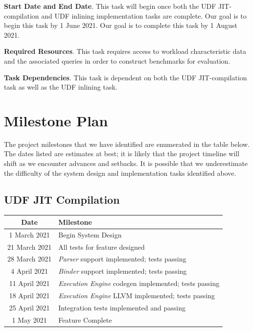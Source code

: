 \documentclass{vldb}
\begin{document}
\textbf{Start Date and End Date}. This task will begin once both the UDF JIT-compilation and UDF inlining implementation tasks are complete. Our goal is to begin this task by 1 June 2021. Our goal is to complete this task by 1 August 2021.

\textbf{Required Resources}. This task requires access to workload characteristic data and the associated queries in order to construct benchmarks for evaluation.

\textbf{Task Dependencies}. This task is dependent on both the UDF JIT-compilation task as well as the UDF inlining task.


\section{Milestone Plan}

The project milestones that we have identified are enumerated in the table below. The dates listed are estimates at best; it is likely that the project timeline will shift as we encounter advances and setbacks. It is possible that we underestimate the difficulty of the system design and implementation tasks identified above.

\subsection{UDF JIT Compilation}

\begin{center}
\begin{tabular}{ |c|l| } 
    \hline
    \textbf{Date} & \textbf{Milestone} \\ 
    \hline
    1 March 2021 & Begin System Design \\
    \hline
    21 March 2021 & All tests for feature designed \\
    \hline
    28 March 2021 & \textit{Parser} support implemented; tests passing \\
    \hline
    4 April 2021 & \textit{Binder} support implemented; tests passing \\
    \hline
    11 April 2021 & \textit{Execution Engine} codegen implemented; tests passing \\
    \hline
    18 April 2021 & \textit{Execution Engine} LLVM implemented; tests passing \\
    \hline
    25 April 2021 & Integration tests implemented and passing \\
    \hline
    1 May 2021 & Feature Complete \\
    \hline
\end{tabular}
\end{center}
\end{document}
